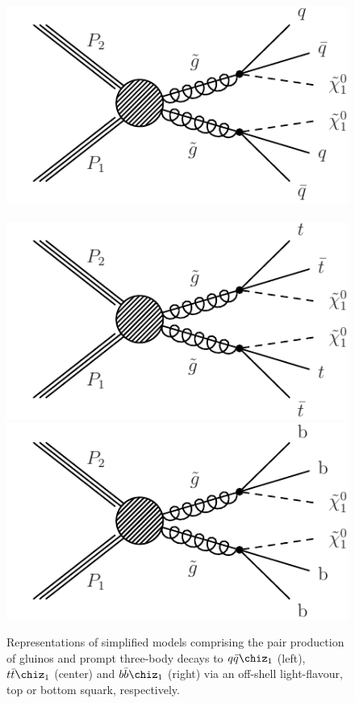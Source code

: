 \begin{figure}[thb]
\centering
\includegraphics[width=0.32\linewidth]{figures/diagrams/T1qqqq_feyn.pdf} \,
\includegraphics[width=0.32\linewidth]{figures/diagrams/T1tttt.pdf}
\includegraphics[width=0.32\linewidth]{figures/diagrams/T1bbbb_feyn.pdf}
\caption{Representations of simplified models comprising the pair
  production of gluinos and prompt three-body decays to
  $q\bar{q}\chiz_{1}$ (left), $t\bar{t}\chiz_{1}$ (center) and $b\bar{b}\chiz_{1}$ (right) via an
  off-shell light-flavour, top or bottom squark, respectively.}
\label{fig:feyn}
\end{figure}


